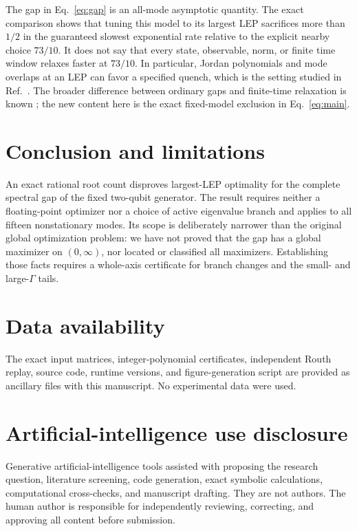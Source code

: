 \documentclass[aps,pra,reprint,superscriptaddress,nofootinbib]{revtex4-2}
\begin{document}
The gap in Eq.~\eqref{eq:gap} is an all-mode asymptotic quantity.  The exact
comparison shows that tuning this model to its largest LEP sacrifices more
than $1/2$ in the guaranteed slowest exponential rate relative to the explicit
nearby choice $73/10$.  It does not say that every state, observable, norm, or
finite time window relaxes faster at $73/10$.  In particular, Jordan
polynomials and mode overlaps at an LEP can favor a specified quench, which is
the setting studied in Ref.~\cite{Popkov2025}.  The broader difference between
ordinary gaps and finite-time relaxation is known \cite{MoriShirai2023}; the
new content here is the exact fixed-model exclusion in Eq.~\eqref{eq:main}.

\section{Conclusion and limitations}

An exact rational root count disproves largest-LEP optimality for the complete
spectral gap of the fixed two-qubit generator.  The result requires neither a
floating-point optimizer nor a choice of active eigenvalue branch and applies
to all fifteen nonstationary modes.  Its scope is deliberately narrower than
the original global optimization problem: we have not proved that the gap has
a global maximizer on $(0,\infty)$, nor located or classified all maximizers.
Establishing those facts requires a whole-axis certificate for branch changes
and the small- and large-$\Gamma$ tails.

\section*{Data availability}

The exact input matrices, integer-polynomial certificates, independent Routh
replay, source code, runtime versions, and figure-generation script are
provided as ancillary files with this manuscript.  No experimental data were
used.

\medskip
\section*{Artificial-intelligence use disclosure}

Generative artificial-intelligence tools assisted with proposing the research
question, literature screening, code generation, exact symbolic calculations,
computational cross-checks, and manuscript drafting.  They are not authors.
The human author is responsible for independently reviewing, correcting, and
approving all content before submission.


\end{document}
